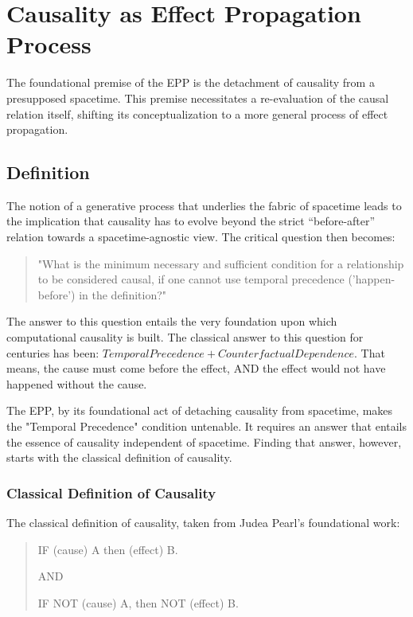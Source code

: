 \section{Causality as Effect Propagation Process}
\label{sec:epp}

The foundational premise of the EPP is the detachment of causality from a presupposed spacetime. 
This premise necessitates a re-evaluation of the causal relation itself, shifting its conceptualization to a more general process of effect propagation. 
 
%
\subsection{Definition}
\label{sec:epp_definition}

The notion of a generative process that underlies the fabric of spacetime leads to the implication that causality has to evolve beyond the strict “before-after” relation towards a spacetime-agnostic view. The critical question then becomes:

\begin{quote}
	"What is the minimum necessary and sufficient condition for a relationship to be considered causal, 
	if one cannot use temporal precedence ('happen-before') in the definition?"
\end{quote}

The answer to this question entails the very foundation upon which computational causality is built. 
The classical answer to this question for centuries has been: $Temporal Precedence + Counterfactual Dependence$.
That means, the cause must come before the effect, AND the effect would not have happened without the cause. 

The EPP, by its foundational act of detaching causality from spacetime, makes the "Temporal Precedence" condition untenable. 
It requires an answer that entails the essence of causality independent of spacetime. Finding that answer, however, 
starts with the classical definition of causality.


\subsubsection{Classical Definition of Causality}


The classical definition of causality, taken from Judea Pearl's foundational work\cite{pearl2000causality}: 

\begin{quote}
    IF (cause) A then (effect) B.
    
    AND 
    
    IF NOT (cause) A, then NOT (effect) B.
\end{quote}

